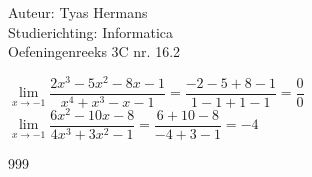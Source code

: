 \documentclass[a4paper]{article}
\begin{document}
  
\noindent \large Auteur: Tyas Hermans \\
\noindent \large Studierichting: Informatica\\
\noindent \large Oefeningenreeks 3C nr. 16.2\\

\medskip

\normalsize

$\lim\limits_{x\rightarrow-1} \dfrac{2x^3-5x^2-8x-1}{x^4+x^3-x-1} = \dfrac{-2-5+8-1}{1-1+1-1} = \dfrac{0}{0}$\\

$\lim\limits_{x\rightarrow-1} \dfrac{6x^2-10x-8}{4x^3+3x^2-1} = \dfrac{6+10-8}{-4+3-1} = -4$\\



\begin{thebibliography}{999}
\end{thebibliography}
\end{document}
